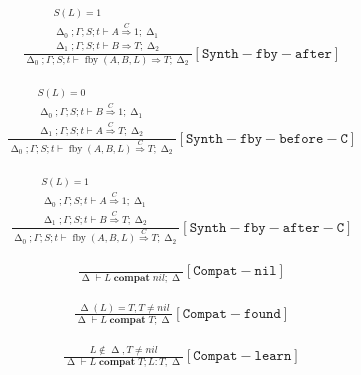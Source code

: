 \documentclass{scrartcl}
\DeclareMathOperator{\fby}{fby}
\DeclareMathOperator{\compat}{\mathbf{compat}}
\DeclareMathOperator{\gtypes}{\Delta}
\begin{document}
    \begin{align*}
    \frac{
        \begin{matrix}
        S(L) = 1 \\
        \gtypes_0; \Gamma; S; t \vdash A \overset{C}{\Rightarrow} 1; \gtypes_1 \\
        \gtypes_1; \Gamma; S; t \vdash B \Rightarrow T; \gtypes_2
        \end{matrix}
    }{
        \gtypes_0; \Gamma; S; t \vdash \fby(A, B, L) \Rightarrow T; \gtypes_2
    }[\mathtt{Synth-fby-after}]
    \end{align*}
    
    \begin{align*}
    \frac{
        \begin{matrix}
        S(L) = 0 \\
        \gtypes_0; \Gamma; S; t \vdash B \overset{C}{\Rightarrow} 1; \gtypes_1 \\
        \gtypes_1; \Gamma; S; t \vdash A \overset{C}{\Rightarrow} T; \gtypes_2
        \end{matrix}
    }{
        \gtypes_0; \Gamma; S; t \vdash \fby(A, B, L) \overset{C}{\Rightarrow} T; \gtypes_2
    }[\mathtt{Synth-fby-before-C}]
    \end{align*}
    
    \begin{align*}
    \frac{
        \begin{matrix}
        S(L) = 1 \\
        \gtypes_0; \Gamma; S; t \vdash A \overset{C}{\Rightarrow} 1; \gtypes_1 \\
        \gtypes_1; \Gamma; S; t \vdash B \overset{C}{\Rightarrow} T; \gtypes_2
        \end{matrix}
    }{
        \gtypes_0; \Gamma; S; t \vdash \fby(A, B, L) \overset{C}{\Rightarrow} T; \gtypes_2
    }[\mathtt{Synth-fby-after-C}]
    \end{align*}
    
    \begin{align*}
    \frac{}{
        \gtypes \vdash L \compat nil; \gtypes
    }[\mathtt{Compat-nil}]
    \end{align*}
    
    \begin{align*}
    \frac{
        \gtypes(L) = T, T \neq nil
    }{
        \gtypes \vdash L \compat T; \gtypes
    }[\mathtt{Compat-found}]
    \end{align*}
    
    \begin{align*}
    \frac{
        L \notin \gtypes, T \neq nil
    }{
        \gtypes \vdash L \compat T; L : T, \gtypes
    }[\mathtt{Compat-learn}]
    \end{align*}
    
\end{document}
